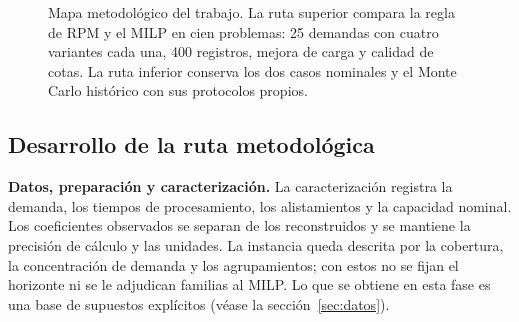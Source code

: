 \begin{landscape}
\begin{figure}[H]
\vspace{6mm}
\caption[Mapa metodológico del trabajo]{Mapa metodológico del trabajo. La ruta superior compara la regla de RPM y el MILP en cien problemas: 25 demandas con cuatro variantes cada una, 400 registros, mejora de carga y calidad de cotas. La ruta inferior conserva los dos casos nominales y el Monte Carlo histórico con sus protocolos propios.}
\label{fig:ruta_metodologica_rpm}
\end{figure}
\end{landscape}

\subsection{Desarrollo de la ruta metodológica}
\textbf{Datos, preparación y caracterización.}
La caracterización registra la demanda, los tiempos de procesamiento, los alistamientos y la capacidad nominal. Los coeficientes observados se separan de los reconstruidos y se mantiene la precisión de cálculo y las unidades. La instancia queda descrita por la cobertura, la concentración de demanda y los agrupamientos; con estos no se fijan el horizonte ni se le adjudican familias al MILP. Lo que se obtiene en esta fase es una base de supuestos explícitos (véase la sección~\ref{sec:datos}).

